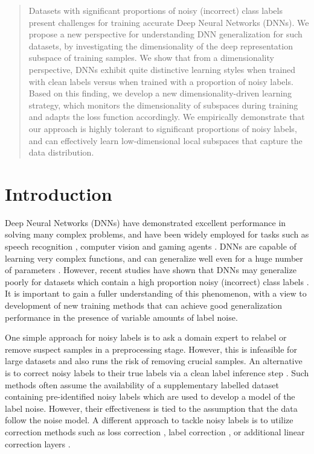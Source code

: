 \documentclass{article}
\begin{document}
\printAffiliationsAndNotice{\icmlEqualContribution} %

\begin{abstract}
Datasets with significant proportions of noisy (incorrect) class labels present challenges for training accurate Deep Neural Networks (DNNs).  We propose a new perspective for understanding DNN generalization for such datasets, by investigating the dimensionality of the deep representation subspace of training samples.  We show that from a dimensionality perspective, DNNs exhibit quite distinctive learning styles when trained with clean labels versus when trained with a proportion of noisy labels.
Based on this finding, we develop a new dimensionality-driven learning strategy, which monitors the dimensionality of subspaces during training and adapts the loss function accordingly.
We empirically demonstrate that our approach is highly tolerant to significant proportions of noisy labels, and can effectively learn low-dimensional local subspaces that capture the data distribution. 

\end{abstract}

\section{Introduction}
\label{sec:intro}
Deep Neural Networks (DNNs) have demonstrated excellent performance in solving many complex problems, and have been widely employed for tasks such as speech recognition \cite{hinton2012deep}, computer vision \cite{he2016deep} and gaming agents \cite{silver2016mastering}. DNNs are capable of learning very complex functions, and can generalize well even for a huge number of parameters \cite{neyshabur2014search}. However, recent studies have shown that DNNs may generalize poorly for datasets which contain a high proportion noisy (incorrect) class labels  \cite{zhang2016understanding}. It is important to gain a fuller understanding of this phenomenon, with a view to development of new training methods that can achieve good generalization performance in the presence of variable amounts of label noise.

One simple approach for noisy labels is to ask a domain expert to relabel or remove suspect samples in a preprocessing stage. However, this is infeasible for large datasets and also runs the risk of removing crucial samples.  An alternative is to correct noisy
labels to their true labels via a clean label inference step \cite{vahdat2017toward,veit2017learning,jiang2017mentornet,li2017learning}. Such methods often assume the availability of a supplementary labelled dataset containing pre-identified noisy labels which are used to develop a model of the label noise. However, their effectiveness is tied to the assumption that the data follow the noise model. A different approach to tackle noisy labels is to utilize correction methods such as loss correction \cite{patrini2017making,ghosh2017robust}, label correction \cite{reed2014training}, or additional linear correction layers \cite{sukhbaatar2014learning,goldberger2016training}.
\end{document}
